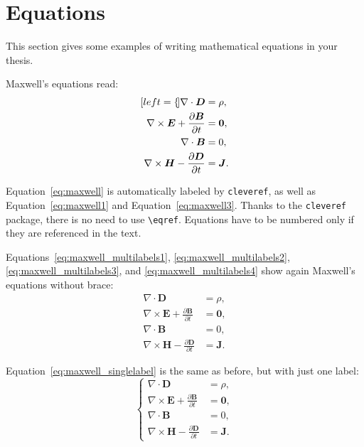 \documentclass[11pt,a4paper]{article}
\begin{document}
\section{Equations}
\label{sec:eqs}
This section gives some examples of writing mathematical equations in your thesis.

Maxwell's equations read:
\begin{subequations}
    \label{eq:maxwell}
    \begin{align}[left=\empheqlbrace]
    \nabla\cdot \bm{D} & = \rho, \label{eq:maxwell1} \\
    \nabla \times \bm{E} +  \frac{\partial \bm{B}}{\partial t} & = \bm{0}, \label{eq:maxwell2} \\
    \nabla\cdot \bm{B} & = 0, \label{eq:maxwell3} \\
    \nabla \times \bm{H} - \frac{\partial \bm{D}}{\partial t} &= \bm{J}. \label{eq:maxwell4}
    \end{align}
\end{subequations}

Equation~\eqref{eq:maxwell} is automatically labeled by \texttt{cleveref},
as well as Equation~\eqref{eq:maxwell1} and Equation~\eqref{eq:maxwell3}.
Thanks to the \verb|cleveref| package, there is no need to use \verb|\eqref|.
Equations have to be numbered only if they are referenced in the text.

Equations~\eqref{eq:maxwell_multilabels1}, \eqref{eq:maxwell_multilabels2}, \eqref{eq:maxwell_multilabels3}, and \eqref{eq:maxwell_multilabels4} show again Maxwell's equations without brace:
\begin{align}
    \nabla\cdot \bm{D} & = \rho, \label{eq:maxwell_multilabels1} \\
    \nabla \times \bm{E} +  \frac{\partial \bm{B}}{\partial t} &= \bm{0}, \label{eq:maxwell_multilabels2} \\
    \nabla\cdot \bm{B} & = 0, \label{eq:maxwell_multilabels3} \\
    \nabla \times \bm{H} - \frac{\partial \bm{D}}{\partial t} &= \bm{J} \label{eq:maxwell_multilabels4}.
\end{align}

Equation~\eqref{eq:maxwell_singlelabel} is the same as before,
but with just one label:
\begin{equation}
    \label{eq:maxwell_singlelabel}
    \left\{
    \begin{aligned}
    \nabla\cdot \bm{D} & = \rho, \\
    \nabla \times \bm{E} +  \frac{\partial \bm{B}}{\partial t} &= \bm{0},\\
    \nabla\cdot \bm{B} & = 0, \\
    \nabla \times \bm{H} - \frac{\partial \bm{D}}{\partial t} &= \bm{J}.
    \end{aligned}
    \right.
\end{equation}
\end{document}
